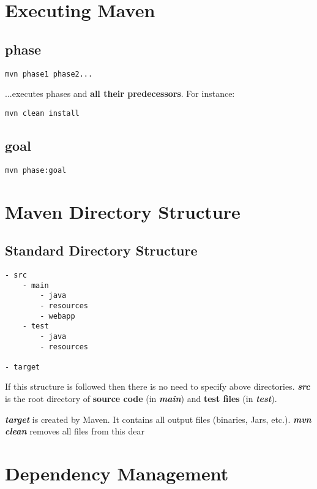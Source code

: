 \documentclass{report}
\begin{document}
\part{Executing Maven}



\chapter{phase}
\begin{verbatim}
mvn phase1 phase2...
\end{verbatim}
...executes phases and \textbf{all their predecessors}. For instance:
\begin{verbatim}
mvn clean install
\end{verbatim}



\chapter{goal}
\begin{verbatim}
mvn phase:goal
\end{verbatim}




\part{Maven Directory Structure}



\chapter{Standard Directory Structure}
\begin{verbatim}
- src
    - main
        - java
        - resources
        - webapp
    - test
        - java
        - resources

- target
\end{verbatim}
If this structure is followed then there is no need to specify above directories. \textit{\textbf{src}} is the root directory of \textbf{source code} 
(in \textit{\textbf{main}}) and \textbf{test files} (in \textbf{\textit{test}}).

\textbf{\textit{target}} is created by Maven. It contains all output files (binaries, Jars, etc.). \textbf{\textit{mvn clean}} removes all files from this dear




\part{Dependency Management}
\end{document}
